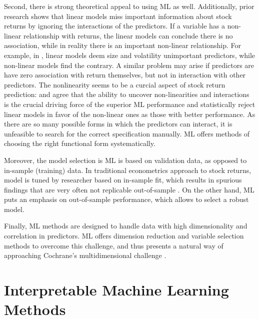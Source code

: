 			Second, there is strong theoretical appeal to using ML as well. Additionally, prior research shows that linear models miss important information about stock returns by ignoring the interactions of the predictors. If a variable has a non-linear relationship with returns, the linear models can conclude there is no association, while in reality there is an important non-linear relationship. For example, in \cite{gu2020empirical}, linear models deem size and volatility unimportant predictors, while non-linear models find the contrary. A similar problem may arise if predictors are have zero association with return themselves, but not in interaction with other predictors. The nonlinearity seems to be a curcial aspect of stock return prediction: \cite{bryzgalova2019forest} and \cite{gu2020empirical} agree that the ability to uncover non-linearities and interactions is the crucial driving force of the superior ML performance and \cite{gu2020empirical} statistically reject linear models in favor of the non-linear ones as those with better performance. As there are so many possible forms in which the predictors can interact, it is unfeasible to search for the correct specification manually. ML offers methods of choosing the right functional form systematically. 
			
			Moreover, the model selection is ML is based on validation data, as opposed to in-sample (training) data. In traditional econometrics approach to stock returns, model is tuned by researcher based on in-sample fit, which results in spurious findings that are very often not replicable out-of-sample \citep{mclean2016does}. On the other hand, ML puts an emphasis on out-of-sample performance, which allows to select a robust model. 	
			
			Finally, ML methods are designed to handle data with high dimensionality and correlation in predictors. ML offers dimension reduction and variable selection methods to overcome this challenge, and thus presents a natural way of approaching Cochrane's multidimensional challenge \citep{cochrane2011presidential}. 	
			
	
	\section{Interpretable Machine Learning Methods}
	
